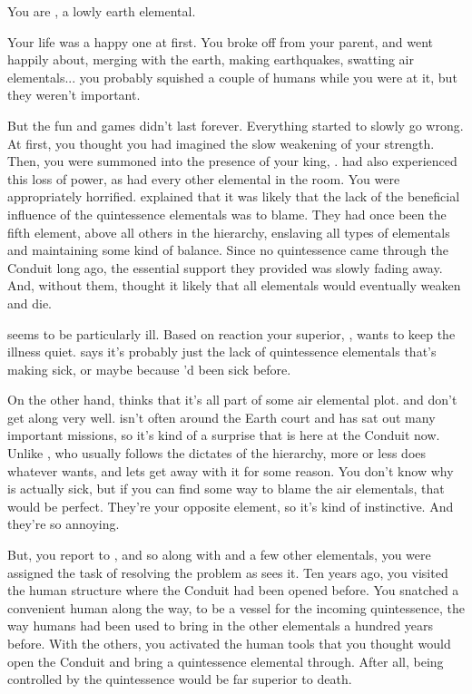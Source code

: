 \documentclass[char]{elementals}
\begin{document}
\name{\cMinion{}}

You are \cMinion{\intro}, a lowly earth elemental.

Your life was a happy one at first.  You broke off from your parent, and went happily about, merging with the earth, making earthquakes, swatting air elementals... you probably squished a couple of humans while you were at it, but they weren't important.

But the fun and games didn't last forever.  Everything started to slowly go wrong.  At first, you thought you had imagined the slow weakening of your strength.  Then, you were summoned into the presence of your king, \cEarthKing{\intro}.  \cEarthKing{\They} had also experienced this loss of power, as had every other elemental in the room.  You were appropriately horrified.  \cEarthKing{} explained that it was likely that the lack of the beneficial influence of the quintessence elementals was to blame.  They had once been the fifth element, above all others in the hierarchy, enslaving all types of elementals and maintaining some kind of balance.  Since no quintessence came through the Conduit long ago, the essential support they provided was slowly fading away.  And, without them, \cEarthKing{} thought it likely that all elementals would eventually weaken and die.  

\cEarthKing{} seems to be particularly ill. Based on \cEarthKing{\their} reaction your superior, \cLoyal{\intro}, wants to keep the illness quiet.  \cLoyal{} says it's probably just the lack of quintessence elementals that's making \cEarthKing{} sick, or maybe because \cEarthKing{\they}'d been sick before.

On the other hand, \cRogue{\intro} thinks that it's all part of some air elemental plot.  \cLoyal{} and \cRogue{} don't get along very well.  \cRogue{} isn't often around the Earth court and has sat out many important missions, so it's kind of a surprise that \cRogue{\they} is here at the Conduit now.  Unlike \cLoyal{}, who usually follows the dictates of the hierarchy, \cRogue{} more or less does whatever \cRogue{\they} wants, and \cEarthKing{} lets \cRogue{\them} get away with it for some reason.  You don't know why \cEarthKing{} is actually sick, but if you can find some way to blame the air elementals, that would be perfect.  They're your opposite element, so it's kind of instinctive.  And they're so annoying.

But, you report to \cLoyal{}, and so along with \cLoyal{\them} and a few other elementals, you were assigned the task of resolving the problem as \cEarthKing{} sees it.  Ten years ago, you visited the human structure where the Conduit had been opened before.  You snatched a convenient human along the way, to be a vessel for the incoming quintessence, the way humans had been used to bring in the other elementals a hundred years before.  With the others, you activated the human tools that you thought would open the Conduit and bring a quintessence elemental through.  After all, being controlled by the quintessence would be far superior to death.
\end{document}
